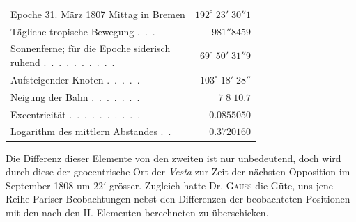 \begin{center}\begin{tabular}{lr}
Epoche 31. März 1807 Mittag in Bremen  & $192^\circ\;23'\;30''1$ \\
Tägliche tropische Bewegung .\ .\ . & $981''8459$ \\
\shortstack[l]{Sonnenferne; für die Epoche siderisch\\ruhend} .\ .\ .\ .\ .\ .\ .\ .\ .\ . & $69^\circ\;50'\;31''9$ \\
Aufsteigender Knoten .\ .\ .\ .\ . & $103^\circ\;18'\;28''$ \\
Neigung der Bahn .\ .\ .\ .\ .\ .\ . & $7\;8\;10.7$ \\
Excentricität .\ .\ .\ .\ .\ .\ .\ .\ .\ . & $0.0855050$ \\
Logarithm des mittlern Abstandes .\ . & $0.3720160$ \\
\end{tabular}\end{center}
\par\indent Die Differenz dieser Elemente von den zweiten ist nur unbedeutend, doch wird durch diese der
geocentrische Ort der \emph{Vesta} zur Zeit der nächsten Opposition im September 1808 um $22'$ grösser. Zugleich hatte Dr. \textsc{Gauss} die Güte, uns jene Reihe Pariser Beobachtungen nebst den Differenzen der beobachteten Positionen mit den nach den II. Elementen berechneten zu überschicken.

